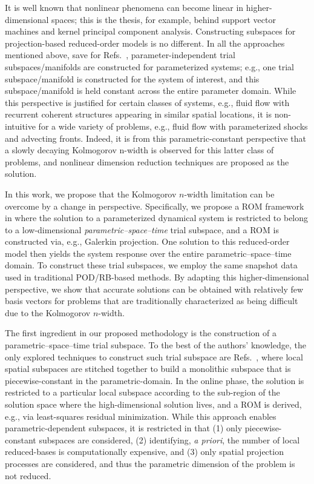 \documentclass[3p,computermodern,10pt]{elsarticle}
\begin{document}
It is well known that nonlinear phenomena can become linear in higher-dimensional spaces; this is the thesis, for example, behind support vector machines and kernel principal component analysis. Constructing subspaces for projection-based reduced-order models is no different. In all the approaches mentioned above, save for Refs.~\cite{}, parameter-independent trial subspaces/manifolds are constructed for parameterized systems; e.g., one trial subspace/manifold is constructed for the system of interest, and this subspace/manifold is held constant across the entire parameter domain. While this perspective is justified for certain classes of systems, e.g., fluid flow with recurrent coherent structures appearing in similar spatial locations, it is non-intuitive for a wide variety of problems, e.g., fluid flow with parameterized shocks and advecting fronts.  Indeed, it is from this parametric-constant perspective that a slowly decaying Kolmogorov n-width is observed for this latter class of problems, and nonlinear dimension reduction techniques are proposed as the solution.

In this work, we propose that the Kolmogorov $n$-width limitation can be overcome by a change in perspective. Specifically, we propose a ROM framework in where the solution to a parameterized dynamical system is restricted to belong to a low-dimensional \textit{parametric--space--time} trial subspace, and a ROM is constructed via, e.g., Galerkin projection.  One solution to this reduced-order model then yields the system response over the entire parametric--space--time domain. To construct these trial subspaces, we employ the same snapshot data used in traditional POD/RB-based methods. By adapting this higher-dimensional perspective, we show that accurate solutions can be obtained with relatively few basis vectors for problems that are traditionally characterized as being difficult due to the Kolmogorov $n$-width. 

The first ingredient in our proposed methodology is the construction of a parametric--space--time trial subspace. To the best of the authors' knowledge, the only explored techniques to construct such trial subspace are Refs.~\cite{}, where local spatial subspaces are stitched together to build a monolithic subspace that is piecewise-constant in the parametric-domain. In the online phase, the solution is restricted to a particular local subspace according to the sub-region of the solution space where the high-dimensional solution lives, and a ROM is derived, e.g., via least-squares residual minimization. While this approach enables parametric-dependent subspaces, it is restricted in that (1) only piecewise-constant subspaces are considered, (2) identifying, \textit{a priori}, the number of local reduced-bases is computationally expensive, and (3) only spatial projection processes are considered, and thus the parametric dimension of the problem is not reduced. 
\end{document}
